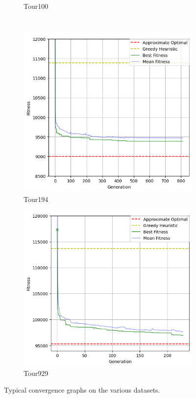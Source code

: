 \documentclass[a4paper,10pt]{article}
\begin{document}
\begin{figure}
\begin{subfigure}[t]{0.5\textwidth}
    \caption{Tour100}
    \label{fig:tour100convergence}
\end{subfigure}\\
\begin{subfigure}[t]{0.5\textwidth}
    \centering
	\includegraphics[width=\textwidth]{results/4.4/tour194_convergence.png}
    \caption{Tour194}
    \label{fig:tour194convergence}
\end{subfigure}
\begin{subfigure}[t]{0.5\textwidth}
    \centering
	\includegraphics[width=\textwidth]{results/4.5/tour929_convergence.png}
    \caption{Tour929}
    \label{fig:tour929convergence}
\end{subfigure}
\caption{Typical convergence graphs on the various datasets.}
\end{figure}
\end{document}
